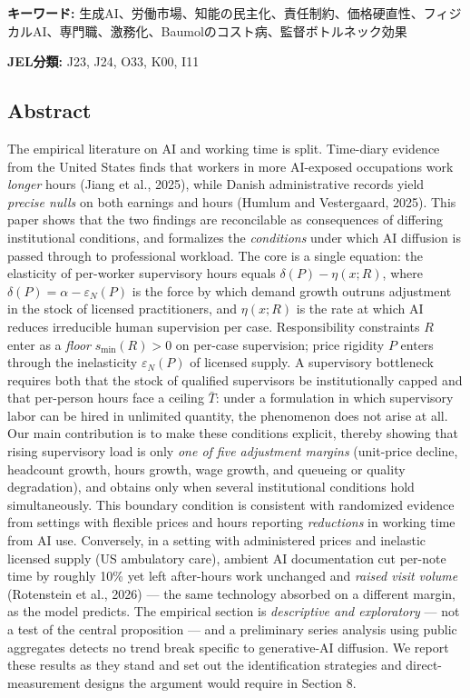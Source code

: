 \documentclass[11pt]{article}
\theoremstyle{plain}
\theoremstyle{definition}
\theoremstyle{remark}
\begin{document}
\smallskip\noindent\textbf{キーワード:} 生成AI、労働市場、知能の民主化、責任制約、価格硬直性、フィジカルAI、専門職、激務化、Baumolのコスト病、監督ボトルネック効果\par
\smallskip\noindent\textbf{JEL分類:} J23, J24, O33, K00, I11\par

\vspace{2mm}
\subsection*{Abstract}
The empirical literature on AI and working time is split. Time-diary evidence from the United States finds that workers in more AI-exposed occupations work \emph{longer} hours (Jiang et al., 2025), while Danish administrative records yield \emph{precise nulls} on both earnings and hours (Humlum and Vestergaard, 2025). This paper shows that the two findings are reconcilable as consequences of differing institutional conditions, and formalizes the \emph{conditions} under which AI diffusion is passed through to professional workload. The core is a single equation: the elasticity of per-worker supervisory hours equals $\delta(P)-\eta(x;R)$, where $\delta(P)=\alpha-\varepsilon_N(P)$ is the force by which demand growth outruns adjustment in the stock of licensed practitioners, and $\eta(x;R)$ is the rate at which AI reduces irreducible human supervision per case. Responsibility constraints $R$ enter as a \emph{floor} $s_{\min}(R)>0$ on per-case supervision; price rigidity $P$ enters through the inelasticity $\varepsilon_N(P)$ of licensed supply. A supervisory bottleneck requires both that the stock of qualified supervisors be institutionally capped and that per-person hours face a ceiling $\bar T$: under a formulation in which supervisory labor can be hired in unlimited quantity, the phenomenon does not arise at all. Our main contribution is to make these conditions explicit, thereby showing that rising supervisory load is only \emph{one of five adjustment margins} (unit-price decline, headcount growth, hours growth, wage growth, and queueing or quality degradation), and obtains only when several institutional conditions hold simultaneously. This boundary condition is consistent with randomized evidence from settings with flexible prices and hours reporting \emph{reductions} in working time from AI use. Conversely, in a setting with administered prices and inelastic licensed supply (US ambulatory care), ambient AI documentation cut per-note time by roughly 10\% yet left after-hours work unchanged and \emph{raised visit volume} (Rotenstein et al., 2026) — the same technology absorbed on a different margin, as the model predicts. The empirical section is \emph{descriptive and exploratory} — not a test of the central proposition — and a preliminary series analysis using public aggregates detects no trend break specific to generative-AI diffusion. We report these results as they stand and set out the identification strategies and direct-measurement designs the argument would require in Section 8.\par
\normalsize
\end{document}
